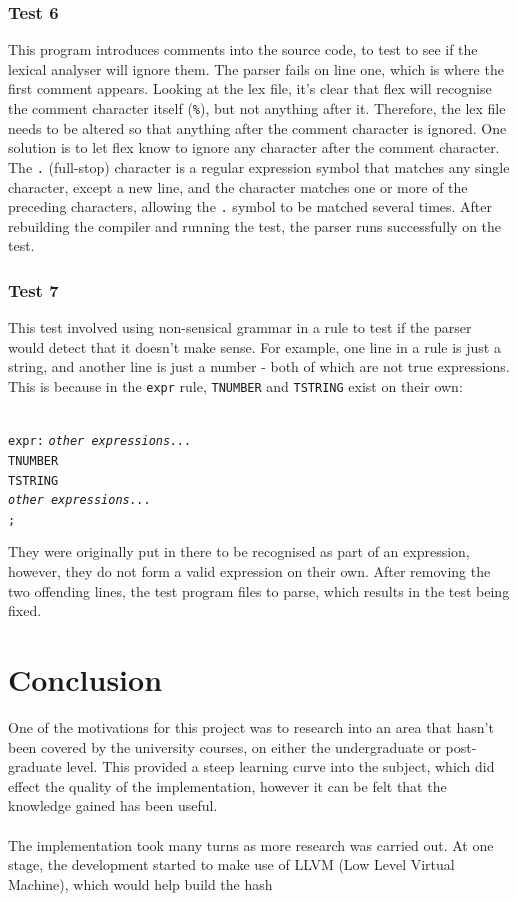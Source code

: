 \documentclass[12pt]{report}
\begin{document}
\subsection{Test 6}\label{sub:sec:test6}
This program introduces comments into the source code, to test to see if the lexical analyser will ignore them.  The parser fails on line one, which is where the first comment appears.  Looking at the lex file, it's clear that flex will recognise the comment character itself (\texttt{\%}), but not anything after it.  Therefore, the lex file needs to be altered so that anything after the comment character is ignored.
One solution is to let flex know to ignore any character after the comment character.  The \texttt{.} (full-stop) character is a regular expression symbol that matches any single character, except a new line, and the \texttt{\*} character matches one or more of the preceding characters, allowing the \texttt{.} symbol to be matched several times.  After rebuilding the compiler and running the test, the parser runs successfully on the test.
\subsection{Test 7}\label{sub:sec:test7}
This test involved using non-sensical grammar in a rule to test if the parser would detect that it doesn't make sense.  For example, one line in a rule is just a string, and another line is just a number - both of which are not true expressions.  This is because in the \texttt{expr} rule, \texttt{TNUMBER} and \texttt{TSTRING} exist on their own:\\
\\
\begin{tabbing}
	\texttt{expr:} \= \texttt{\textit{other expressions...}}\\
	\> \texttt{\textbar \space TNUMBER}\\
	\> \texttt{\textbar \space TSTRING}\\
	\> \texttt{\textbar \space \textit{other expressions...}}\\
	\> \texttt{;}\\
\end{tabbing}
They were originally put in there to be recognised as part of an expression, however, they do not form a valid expression on their own.  After removing the two offending lines, the test program files to parse, which results in the test being fixed.
\chapter{Conclusion}
One of the motivations for this project was to research into an area that hasn't been covered by the university courses, on either the undergraduate or post-graduate level.  This provided a steep learning curve into the subject, which did effect the quality of the implementation, however it can be felt that the knowledge gained has been useful.\\
\\
The implementation took many turns as more research was carried out.  At one stage, the development started to make use of LLVM (Low Level Virtual Machine), which would help build the hash
\end{document}

